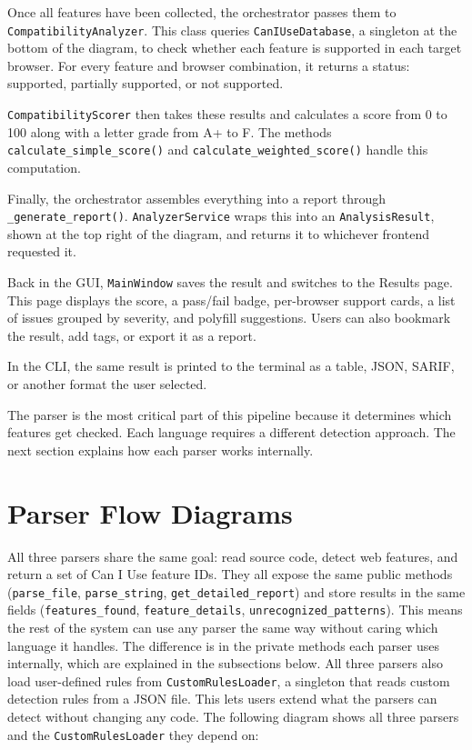 Once all features have been collected, the orchestrator passes them to \texttt{CompatibilityAnalyzer}. This class queries \texttt{CanIUseDatabase}, a singleton at the bottom of the diagram, to check whether each feature is supported in each target browser. For every feature and browser combination, it returns a status: supported, partially supported, or not supported.

\texttt{CompatibilityScorer} then takes these results and calculates a score from 0 to 100 along with a letter grade from A+ to F. The methods \texttt{calculate\_simple\_score()} and \texttt{calculate\_weighted\_score()} handle this computation.

Finally, the orchestrator assembles everything into a report through \texttt{\_generate\_report()}. \texttt{AnalyzerService} wraps this into an \texttt{AnalysisResult}, shown at the top right of the diagram, and returns it to whichever frontend requested it.

Back in the GUI, \texttt{MainWindow} saves the result and switches to the Results page. This page displays the score, a pass/fail badge, per-browser support cards, a list of issues grouped by severity, and polyfill suggestions. Users can also bookmark the result, add tags, or export it as a report.

In the CLI, the same result is printed to the terminal as a table, JSON, SARIF, or another format the user selected.

The parser is the most critical part of this pipeline because it determines which features get checked. Each language requires a different detection approach. The next section explains how each parser works internally.

\section{Parser Flow Diagrams}
\label{sec:parser-flows}

All three parsers share the same goal: read source code, detect web features, and return a set of Can I Use feature IDs. They all expose the same public methods (\texttt{parse\_file}, \texttt{parse\_string}, \texttt{get\_detailed\_report}) and store results in the same fields (\texttt{features\_found}, \texttt{feature\_details}, \texttt{unrecognized\_patterns}). This means the rest of the system can use any parser the same way without caring which language it handles. The difference is in the private methods each parser uses internally, which are explained in the subsections below. All three parsers also load user-defined rules from \texttt{CustomRulesLoader}, a singleton that reads custom detection rules from a JSON file. This lets users extend what the parsers can detect without changing any code.
The following diagram shows all three parsers and the \texttt{CustomRulesLoader} they depend on:

